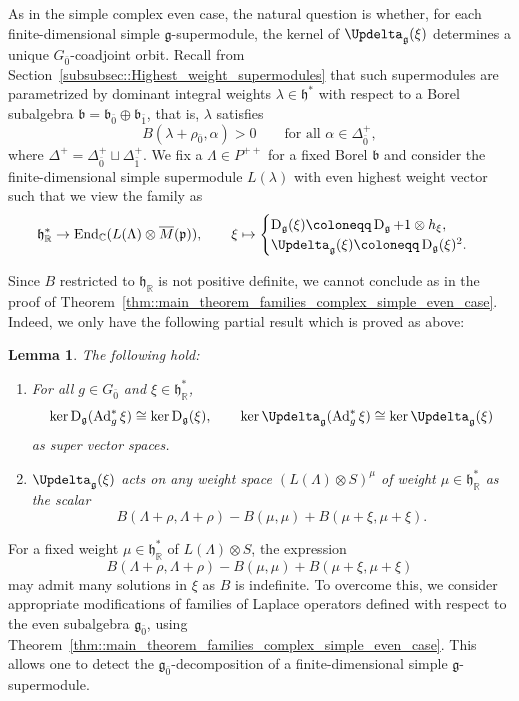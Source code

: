 \documentclass[11pt]{amsart}
\newcommand{\End}{\operatorname{End}}
\newcommand{\Dirac}{\operatorname{D}}
\def\Laplace{{\Updelta_{\gg}(\xi)}}
\def\CC{{\mathbb C}}
\def\RR{{\mathbb R}}
\def\hh{{\mathfrak h}}
\def\pp{{\mathfrak p}}
\def\bb{{\mathfrak b}}
\def\even{{\mathfrak{g}_{\bar{0}}}}
\def\pp{{\mathfrak p}}
\def\pp{{\mathfrak{p}}}
\def\gg{{\mathfrak{g}}}
\newcommand{\Ad}{\operatorname{Ad}}
\theoremstyle{plain}
\newtheorem{lemma}[theorem]{Lemma}
\theoremstyle{remark}
\theoremstyle{definition}
\numberwithin{equation}{section}
\theoremstyle{remark}
\begin{document}
As in the simple complex even case, the natural question is whether, for each finite-dimensional simple $\gg$-supermodule, the kernel of $\Laplace$ determines a unique $G_{\bar 0}$-coadjoint orbit. Recall from Section~\ref{subsubsec::Highest_weight_supermodules} that such supermodules are parametrized by dominant integral weights $\lambda\in\hh^{\ast}$ with respect to a Borel subalgebra $\bb=\bb_{\bar{0}}\oplus\bb_{\bar{1}}$, that is, $\lambda$ satisfies
\begin{equation}
B(\lambda+\rho_{\bar{0}},\alpha)>0\qquad\text{for all }\alpha\in\Delta_{\bar{0}}^{+},
\end{equation}
where $\Delta^{+}=\Delta_{\bar{0}}^{+}\sqcup\Delta_{\bar{1}}^{+}$. We fix a $\Lambda \in P^{++}$ for a fixed Borel $\bb$ and consider the finite-dimensional simple supermodule $L(\lambda)$ with even highest weight vector such that we view the family as
\begin{equation}
 \hh_{\RR}^{\ast} \to \End_{\CC}(L(\Lambda)\otimes \overline{M}(\pp)), \qquad \xi \mapsto \begin{cases}
\Dirac_{\gg}(\xi)\coloneqq \Dirac_{\gg}+1\otimes h_{\xi},\\
\Laplace\coloneqq \Dirac_{\gg}(\xi)^{2}.
\end{cases}
\end{equation}

Since $B$ restricted to $\hh_{\RR}$ is not positive definite, we cannot conclude as in the proof of Theorem~\ref{thm::main_theorem_families_complex_simple_even_case}. Indeed, we only have the following partial result which is proved as above:

\begin{lemma} The following hold:
 \begin{enumerate}
 \item[a)] For all $g\in G_{\bar{0}}$ and $\xi\in\hh_{\RR}^{\ast}$,
\[
\ker \Dirac_{\gg}(\Ad_{g}^{\ast}\xi)\cong \ker \Dirac_{\gg}(\xi),
\qquad
\ker \Updelta_{\gg}(\Ad_{g}^{\ast}\xi)\cong \ker \Updelta_{\gg}(\xi)
\]
as super vector spaces.
 \item[b)] $\Laplace$ acts on any weight space $(L(\Lambda)\otimes S)^{\mu}$ of weight $\mu \in \hh_{\RR}^{\ast}$ as the scalar
 \[
 B(\Lambda+\rho, \Lambda+\rho)-B(\mu,\mu)+B(\mu+\xi, \mu+\xi).
 \]
 \end{enumerate}
\end{lemma}

For a fixed weight $\mu\in\hh_{\RR}^{\ast}$ of $L(\Lambda)\otimes S$, the expression
\begin{equation}
B(\Lambda+\rho,\Lambda+\rho)-B(\mu,\mu)+B(\mu+\xi,\mu+\xi)
\end{equation}
may admit many solutions in $\xi$ as $B$ is indefinite. To overcome this, we consider appropriate modifications of families of Laplace operators defined with respect to the even subalgebra $\even$, using Theorem~\ref{thm::main_theorem_families_complex_simple_even_case}. This allows one to detect the $\even$-decomposition of a finite-dimensional simple $\gg$-supermodule. 
\end{document}
